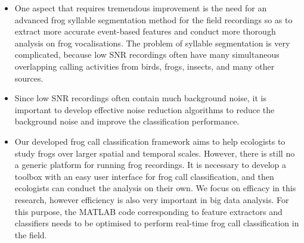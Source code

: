 \begin{itemize}

\item  One aspect that requires tremendous improvement is the need for an advanced frog syllable segmentation method for the field recordings so as to extract more accurate event-based features and conduct more thorough analysis on frog vocalisations. The problem of syllable segmentation is very complicated, because low SNR recordings often have many simultaneous overlapping calling activities from birds, frogs, insects, and many other sources. 

\item Since low SNR recordings often contain much background noise, it is important to develop effective noise reduction algorithms to reduce the background noise and improve the classification performance.



\item Our developed frog call classification framework aims to help ecologists to study frogs over larger spatial and temporal scales. However, there is still no a generic platform for running frog recordings. It is necessary to develop a toolbox with an easy user interface for frog call classification, and then ecologists can conduct the analysis on their own. We focus on efficacy in this research, however efficiency is also very important in big data analysis. For this purpose, the MATLAB code corresponding to feature extractors and classifiers needs to be optimised to perform real-time frog call classification in the field.


\end{itemize}










